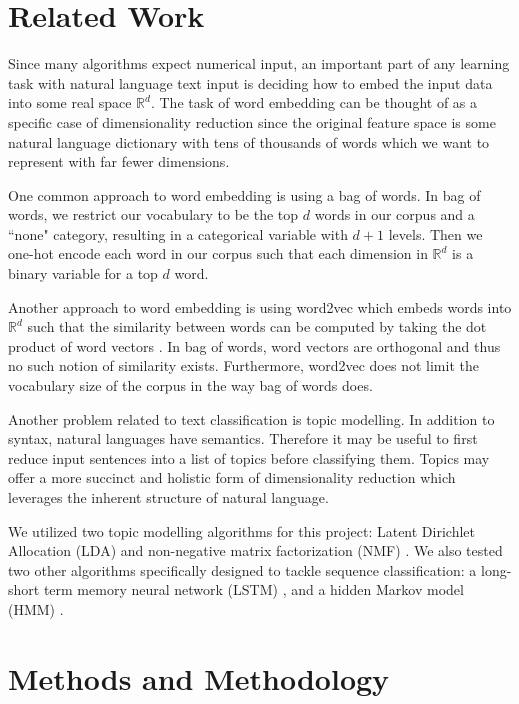 \documentclass{article}
\begin{document}
\section{Related Work}
\label{related-work}

Since many algorithms expect numerical input, an important part of any learning
task with natural language text input is deciding how to embed the input data
into some real space $\mathbb{R}^d$. The task of word embedding can be thought of
as a specific case of dimensionality reduction since the original feature space
is some natural language dictionary with tens of thousands of words which we
want to represent with far fewer dimensions.

One common approach to word embedding is using a bag of words. In bag of words,
we restrict our vocabulary to be the top $d$ words in our corpus and a ``none"
category, resulting in a categorical variable with $d + 1$ levels. Then we
one-hot encode each word in our corpus such that each dimension in
$\mathbb{R}^d$ is a binary variable for a top $d$ word.

Another approach to word embedding is using word2vec which embeds words into 
$\mathbb{R}^d$ such that
the similarity between words can be computed by taking the dot product of word
vectors \cite{word2vec}. In bag of words, word vectors are orthogonal and thus no such notion
of similarity exists. Furthermore, word2vec does not limit the vocabulary size
of the corpus in the way bag of words does.

Another problem related to text classification is topic modelling. In addition to
syntax, natural languages have semantics. Therefore it may be useful to first
reduce input sentences into a list of topics before classifying them. Topics
may offer a more succinct and holistic form of dimensionality reduction which leverages
the inherent structure of natural language.

We utilized two topic modelling algorithms for this project: Latent Dirichlet 
Allocation (LDA) \cite{lda} and non-negative matrix factorization (NMF)
\cite{nnmf}. 
We also tested two other algorithms specifically designed to tackle sequence
classification: a long-short term memory neural network (LSTM)
\cite{lstm}, and a hidden
Markov model (HMM) \cite{hmm}. 

\section{Methods and Methodology}
\label{methods}
\end{document}
